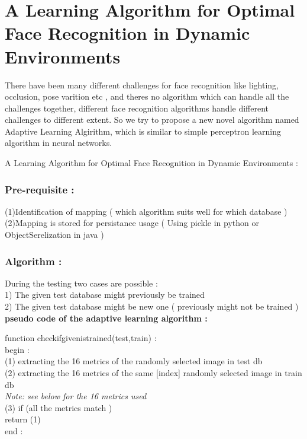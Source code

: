 \documentclass[10pt,a4paper]{article}
\begin{document}
\newcommand{\tab}{\hspace*{4em}}


\section{A Learning Algorithm for Optimal Face Recognition in Dynamic Environments } 

There have been many different challenges for face recognition like lighting, occlusion, pose varition etc , and theres no algorithm which can handle all the challenges together, different face recognition algorithms handle different challenges to different extent. So we try to propose a new novel algorithm named Adaptive Learning Algirithm, which is similar to simple perceptron learning algorithm in neural networks. 

A Learning Algorithm for Optimal Face Recognition in Dynamic Environments : 

\subsubsection{Pre-requisite :} 

\tab (1)Identification of mapping ( which algorithm suits well for which \tab  database ) \\
\tab (2)Mapping is stored for persistance usage ( Using pickle in python or \tab ObjectSerelization in java ) \\

\subsubsection{Algorithm :}

During the testing two cases are possible :  \\ 

1) The given test database might previously be trained  \\
2) The given test database might be new one ( previously might not be trained ) \\

\textbf{pseudo code of the adaptive learning algorithm : \\}

function checkifgivenistrained(test,train) : \\
begin : \\
\tab  (1) extracting the 16 metrics of the randomly selected image in test db \\
\tab  (2) extracting the 16 metrics of the same [index] randomly selected \tab image in train db \\
\tab \textit{Note: see below for the 16 metrics used} \\
\tab  (3) if (all the metrics match ) \\
\tab \tab  	return (1) \\
end : \\
\end{document}
